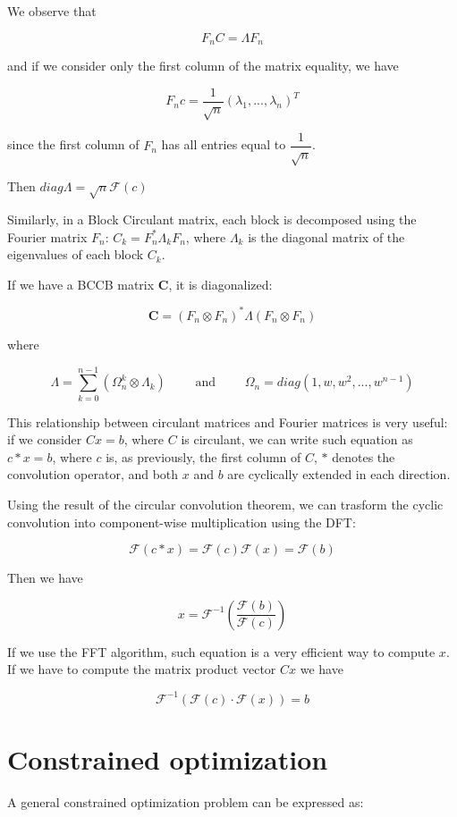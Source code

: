 We observe that

$$F_n C = \Lambda F_n$$

and if we consider only the first column of the matrix equality, we have

$$F_n c = \dfrac{1}{\sqrt{n}} (\lambda_1,...,\lambda_n)^T$$

since the first column of $F_n$ has all entries equal to $\dfrac{1}{\sqrt{n}}$.

Then $diag{\Lambda} =  \sqrt{n} \mathcal{F}(c)$

Similarly, in a Block Circulant matrix, each block is decomposed using the Fourier matrix $F_n$: $C_k = F_n^* \Lambda_k F_n$, where $\Lambda_k$ is the diagonal matrix of the eigenvalues of each block $C_k$.

If we have a BCCB matrix $\mathbf{C}$, it is diagonalized\citep{circulant}:

$$\mathbf{C} = (F_n \otimes F_n)^* \Lambda (F_n \otimes F_n)$$

where

$$\Lambda = \sum_{k=0}^{n-1} (\Omega_n^k \otimes \Lambda_k) \qquad \mbox{ and } \qquad \Omega_n = diag(1,w,w^2,...,w^{n-1})$$

This relationship between circulant matrices and Fourier matrices is very useful: if we consider $Cx=b$, where $C$ is circulant, we can write such equation as $c * x = b$, where $c$ is, as previously, the first column of $C$, $*$ denotes the convolution operator, and both $x$ and $b$ are cyclically extended in each direction.

Using the result of the circular convolution theorem, we can trasform the cyclic convolution into component-wise multiplication using the DFT:

$$\mathcal{F}(c * x) = \mathcal{F}(c) \mathcal{F}(x) = \mathcal{F}(b)$$

Then we have

$$x = \mathcal{F}^{-1} \left(\dfrac{\mathcal{F}(b)}{\mathcal{F}(c)}\right)$$

If we use the FFT algorithm, such equation is a very efficient way to compute $x$.
If we have to compute the matrix product vector $Cx$ we have

$$\mathcal{F}^{-1} (\mathcal{F}(c) \cdot \mathcal{F}(x) ) = b $$

\section{Constrained optimization}

A general constrained optimization problem can be expressed as:

